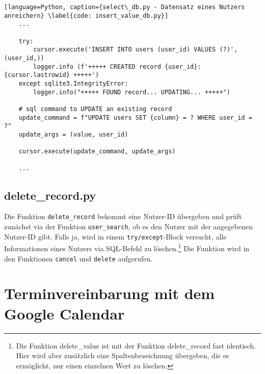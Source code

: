             \begin{lstlisting}[language=Python, caption={select\_db.py - Datensatz eines Nutzers anreichern} \label{code: insert_value_db.py}]
    ...

    try:
        cursor.execute('INSERT INTO users (user_id) VALUES (?)', (user_id,))
        logger.info (f'+++++ CREATED record {user_id}: {cursor.lastrowid} +++++')
    except sqlite3.IntegrityError:
        logger.info("+++++ FOUND record... UPDATING... +++++")

    # sql command to UPDATE an existing record
    update_command = f"UPDATE users SET {column} = ? WHERE user_id = ?"
    update_args = (value, user_id)

    cursor.execute(update_command, update_args)

    ...

            \end{lstlisting}
        
        \subsection{delete\_record.py} \label{Implementierung: delete_record.py}
            Die Funktion \verb|delete_record| bekommt eine Nutzer-ID übergeben und prüft zunächst via der Funktion \verb|user_search|, ob es den Nutzer mit der angegebenen Nutzer-ID gibt. Falls ja, wird in einem \verb|try/except|-Block versucht, alle Informationen eines Nutzers via SQL-Befehl zu löschen.\footnote{Die Funktion delete\_value ist mit der Funktion delete\_record fast identisch. Hier wird aber zusätzlich eine Spaltenbezeichnung übergeben, die es ermöglicht, nur einen einzelnen Wert zu löschen.} Die Funktion wird in den Funktionen \verb|cancel| und \verb|delete| aufgerufen.











    \section{Terminvereinbarung mit dem Google Calendar} \label{Implementierung: Kalender} 
        
